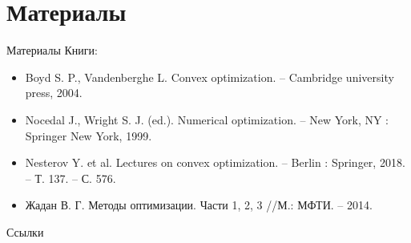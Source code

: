 \documentclass[9pt, aspectratio=169]{beamer}
\begin{document}
\section{Материалы}

\begin{frame}{Материалы}
    Книги:
    \begin{itemize}
        \item Boyd S. P., Vandenberghe L. Convex optimization. – Cambridge university press, 2004.
        \item Nocedal J., Wright S. J. (ed.). Numerical optimization. – New York, NY : Springer New York, 1999.
        \item Nesterov Y. et al. Lectures on convex optimization. – Berlin : Springer, 2018. – Т. 137. – С. 576.
        \item Жадан В. Г. Методы оптимизации. Части 1, 2, 3 //М.: МФТИ. – 2014.
    \end{itemize}

    Ссылки

     

\end{frame}
\end{document}
